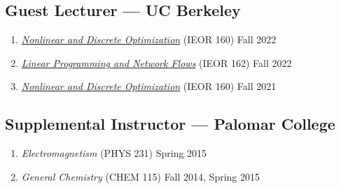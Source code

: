 \documentclass[11pt]{article}
\newcommand{\subsectionskip}{\baselineskip}	%
\newcommand{\cvdate}[1]{\hfill#1}			%
\begin{document}
	\vspace*{\subsectionskip}

	\subsection{Guest Lecturer --- UC Berkeley}

	\begin{enumerate}[label={\arabic*.}]
		\item \href{https://lavaei.ieor.berkeley.edu/Course_IEOR160_Fall_2022.html}{\textit{Nonlinear and Discrete Optimization}} (IEOR 160) \cvdate{Fall 2022}
		\item \href{https://lavaei.ieor.berkeley.edu/Course_IEOR162_Fall_2022.html}{\textit{Linear Programming and Network Flows}} (IEOR 162) \cvdate{Fall 2022}
		\item \href{https://lavaei.ieor.berkeley.edu/Course_IEOR160_Fall_2021.html}{\textit{Nonlinear and Discrete Optimization}} (IEOR 160) \cvdate{Fall 2021}
	\end{enumerate}

	\vspace*{\subsectionskip}
	
	\subsection{Supplemental Instructor --- Palomar College}	
	\begin{enumerate}[label={\arabic*.}]
		\item \textit{Electromagnetism} (PHYS 231) \cvdate{Spring 2015}
		\item \textit{General Chemistry} (CHEM 115) \cvdate{Fall 2014, Spring 2015}
	\end{enumerate}
	
\end{document}

